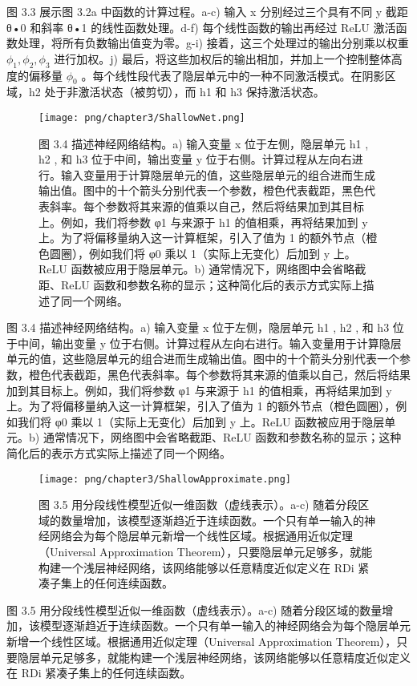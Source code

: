 图 3.3 展示图 3.2a 中函数的计算过程。a-c) 输入 x 分别经过三个具有不同 y 截距 θ•0 和斜率 θ•1 的线性函数处理。d-f) 每个线性函数的输出再经过 ReLU 激活函数处理，将所有负数输出值变为零。g-i) 接着，这三个处理过的输出分别乘以权重 \(\phi_1 , \phi_2 , \phi_3\) 进行加权。j) 最后，将这些加权后的输出相加，并加上一个控制整体高度的偏移量 \(\phi_0\) 。每个线性段代表了隐层单元中的一种不同激活模式。在阴影区域，h2 处于非激活状态（被剪切），而 h1 和 h3 保持激活状态。


\begin{figure}[h!]
\centering
\texttt{[image: png/chapter3/ShallowNet.png]}
\caption{图 3.4 描述神经网络结构。a) 输入变量 x 位于左侧，隐层单元 h1 , h2 , 和 h3 位于中间，输出变量 y 位于右侧。计算过程从左向右进行。输入变量用于计算隐层单元的值，这些隐层单元的组合进而生成输出值。图中的十个箭头分别代表一个参数，橙色代表截距，黑色代表斜率。每个参数将其来源的值乘以自己，然后将结果加到其目标上。例如，我们将参数 φ1 与来源于 h1 的值相乘，再将结果加到 y 上。为了将偏移量纳入这一计算框架，引入了值为 1 的额外节点（橙色圆圈），例如我们将 φ0 乘以 1（实际上无变化）后加到 y 上。ReLU 函数被应用于隐层单元。b) 通常情况下，网络图中会省略截距、ReLU 函数和参数名称的显示；这种简化后的表示方式实际上描述了同一个网络。}
\end{figure}

图 3.4 描述神经网络结构。a) 输入变量 x 位于左侧，隐层单元 h1 , h2 , 和 h3 位于中间，输出变量 y 位于右侧。计算过程从左向右进行。输入变量用于计算隐层单元的值，这些隐层单元的组合进而生成输出值。图中的十个箭头分别代表一个参数，橙色代表截距，黑色代表斜率。每个参数将其来源的值乘以自己，然后将结果加到其目标上。例如，我们将参数 φ1 与来源于 h1 的值相乘，再将结果加到 y 上。为了将偏移量纳入这一计算框架，引入了值为 1 的额外节点（橙色圆圈），例如我们将 φ0 乘以 1（实际上无变化）后加到 y 上。ReLU 函数被应用于隐层单元。b) 通常情况下，网络图中会省略截距、ReLU 函数和参数名称的显示；这种简化后的表示方式实际上描述了同一个网络。


\begin{figure}[h!]
\centering
\texttt{[image: png/chapter3/ShallowApproximate.png]}
\caption{图 3.5 用分段线性模型近似一维函数（虚线表示）。a-c) 随着分段区域的数量增加，该模型逐渐趋近于连续函数。一个只有单一输入的神经网络会为每个隐层单元新增一个线性区域。根据通用近似定理（Universal Approximation Theorem），只要隐层单元足够多，就能构建一个浅层神经网络，该网络能够以任意精度近似定义在 RDi 紧凑子集上的任何连续函数。}
\end{figure}

图 3.5 用分段线性模型近似一维函数（虚线表示）。a-c) 随着分段区域的数量增加，该模型逐渐趋近于连续函数。一个只有单一输入的神经网络会为每个隐层单元新增一个线性区域。根据通用近似定理（Universal Approximation Theorem），只要隐层单元足够多，就能构建一个浅层神经网络，该网络能够以任意精度近似定义在 RDi 紧凑子集上的任何连续函数。


